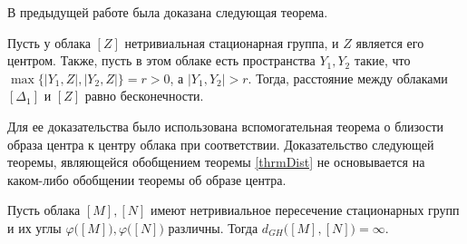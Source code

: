 В предыдущей работе была доказана следующая теорема.
\begin{theorem}
  Пусть у облака $[Z]$ нетривиальная стационарная группа, и $Z$
  является его центром. Также, пусть в этом облаке есть пространства $Y_{1},
  Y_{2}$ такие, что $\max\big\{ |Y_{1},Z|, |Y_{2}, Z| \big\} = r>0$, а
  $|Y_{1}, Y_{2}|>r$. Тогда, расстояние между облаками $[\Delta_1]$ и $[Z]$
  равно бесконечности. \label{thrmDist}
\end{theorem}
Для ее доказательства было использована вспомогательная теорема о
близости образа центра к центру облака при соответствии.
Доказательство следующей теоремы, являющейся обобщением теоремы
\ref{thrmDist} не основывается на каком-либо обобщении теоремы об образе центра.
\begin{theorem}
  Пусть облака \( [M], [N] \) имеют нетривиальное пересечение
  стационарных групп и их углы \( \varphi \big([M]\big), \varphi
  \big([N]\big) \) различны. Тогда \( d_{GH} \big([M], [N]\big) = \infty \).
\end{theorem}
